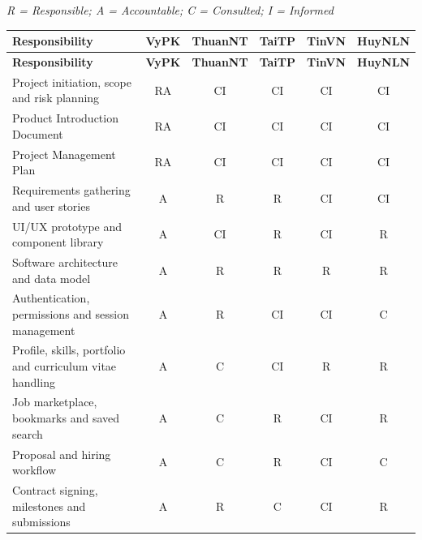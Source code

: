 \renewcommand{\arraystretch}{1.3}

\textit{R = Responsible;\;
A = Accountable;\;
C = Consulted;\;
I = Informed}

\vspace{0.3cm}

\small

\begin{longtable}{|p{5.6cm}|c|c|c|c|c|}
\hline
\rowcolor{headerbg}
\textbf{Responsibility}
&
\textbf{VyPK}
&
\textbf{ThuanNT}
&
\textbf{TaiTP}
&
\textbf{TinVN}
&
\textbf{HuyNLN}
\\ \hline
\endfirsthead

\hline
\rowcolor{headerbg}
\textbf{Responsibility}
&
\textbf{VyPK}
&
\textbf{ThuanNT}
&
\textbf{TaiTP}
&
\textbf{TinVN}
&
\textbf{HuyNLN}
\\ \hline
\endhead

\hline
\endfoot
\hline
\endlastfoot

Project initiation, scope and risk planning
& RA & CI & CI & CI & CI \\ \hline

Product Introduction Document
& RA & CI & CI & CI & CI \\ \hline

Project Management Plan
& RA & CI & CI & CI & CI \\ \hline

Requirements gathering and user stories
& A & R & R & CI & CI \\ \hline

UI/UX prototype and component library
& A & CI & R & CI & R \\ \hline

Software architecture and data model
& A & R & R & R & R \\ \hline

Authentication, permissions and session management
& A & R & CI & CI & C \\ \hline

Profile, skills, portfolio and curriculum vitae handling
& A & C & CI & R & R \\ \hline

Job marketplace, bookmarks and saved search
& A & C & R & CI & R \\ \hline

Proposal and hiring workflow
& A & C & R & CI & C \\ \hline

Contract signing, milestones and submissions
& A & R & C & CI & R \\ \hline


\end{longtable}
